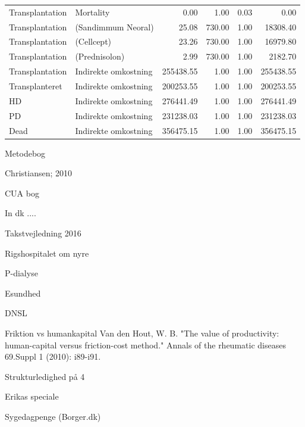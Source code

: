 \documentclass[a4paper,12pt]{article}
\begin{document}
\begin{adjustbox}{center}
\begin{tabular}{llrrrr}
		Transplantation & Mortality & 0.00 & 1.00 & 0.03 & 0.00 \\ 
		Transplantation & (Sandimmum Neoral) & 25.08 & 730.00 & 1.00 & 18308.40 \\ 
		Transplantation & (Cellcept) & 23.26 & 730.00 & 1.00 & 16979.80 \\ 
		Transplantation & (Prednisolon) & 2.99 & 730.00 & 1.00 & 2182.70 \\ 
		Transplantation & Indirekte omkostning & 255438.55 & 1.00 & 1.00 & 255438.55 \\ 
		Transplanteret & Indirekte omkostning & 200253.55 & 1.00 & 1.00 & 200253.55 \\ 
		HD & Indirekte omkostning & 276441.49 & 1.00 & 1.00 & 276441.49 \\ 
		PD & Indirekte omkostning & 231238.03 & 1.00 & 1.00 & 231238.03 \\ 
		Dead & Indirekte omkostning & 356475.15 & 1.00 & 1.00 & 356475.15 \\ 
		\hline
	\end{tabular}

\end{adjustbox}



\newpage
\begin{thebibliography}{9}

Metodebog

Christiansen; 2010

CUA bog

In dk .... 

Takstvejledning 2016

Rigshospitalet om nyre

P-dialyse

Esundhed

DNSL

Friktion vs humankapital
Van den Hout, W. B. "The value of productivity: human-capital versus friction-cost method." Annals of the rheumatic diseases 69.Suppl 1 (2010): i89-i91.

Strukturledighed på 4%

Erikas speciale 

Sygedagpenge (Borger.dk)


\end{thebibliography}	
	
\end{document}
